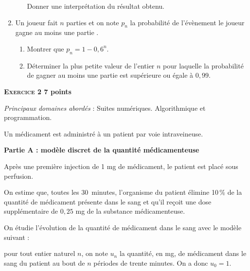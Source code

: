 \documentclass[10pt,a4paper]{article}
\begin{document}
\begin{enumerate}
\begin{enumerate}
Donner une interprétation du résultat obtenu.
	\end{enumerate}
\item Un joueur fait $n$ parties et on note $p_n$ la probabilité de l'évènement \og le joueur gagne au moins une partie \fg.
	\begin{enumerate}
		\item Montrer que $p_n = 1 - 0,6^n$.
		\item Déterminer la plus petite valeur de l'entier $n$ pour laquelle la probabilité de gagner au moins une partie est supérieure ou égale à $0,99$.
	\end{enumerate}
\end{enumerate}

\bigskip

\textbf{\textsc{Exercice 2} \hfill 7 points}

\medskip

\emph{Principaux domaines abordés} : Suites numériques. Algorithmique et programmation.

\medskip

Un médicament est administré à un patient par voie intraveineuse. 

\bigskip

\textbf{Partie A : modèle discret de la quantité médicamenteuse}

\medskip

Après une première injection de 1 mg de médicament, le patient est placé sous perfusion.

On estime que, toutes les $30$~minutes, l'organisme du patient élimine 10\,\% de la quantité de médicament présente dans le sang et qu'il reçoit une dose supplémentaire de $0,25$ mg de la substance médicamenteuse.

On étudie l'évolution de la quantité de médicament dans le sang avec le modèle suivant :

pour tout entier naturel $n$, on note $u_n$ la quantité, en mg, de médicament dans le sang du patient au bout de $n$ périodes de trente minutes. On a donc $u_0 = 1$.

\medskip
\end{document}
